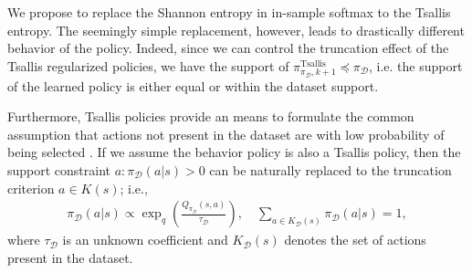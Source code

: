 \documentclass{article}
\newcommand{\AdaBracket}[1]{\left(#1\right)}
\newcommand{\AdaRectBracket}[1]{\left[#1\right]}
\newcommand{\expectation}[2]{\mathbb{E}_{#1}\AdaRectBracket{#2}}
\newcommand{\datasetPolicy}{\pi_{\mathcal{D}}}
\begin{document}
We propose to replace the Shannon entropy in in-sample softmax to the Tsallis entropy.
The seemingly simple replacement, however, leads to drastically different behavior of the policy.
Indeed, since we can control the truncation effect of the Tsallis regularized policies, we have the support of $\pi^{\text{Tsallis}}_{\datasetPolicy, k+1} \preceq \datasetPolicy$, i.e. the support of the learned policy is either equal or within the dataset support.

Furthermore, Tsallis policies provide an means to formulate the common assumption that actions not present in the dataset are with low probability of being selected \cite{Kostrikov2021-fisherCriticReg}.
If we assume the behavior policy is also a Tsallis policy, then the support constraint $a:\datasetPolicy(a|s)>0$ can be naturally replaced to the truncation criterion $a\in K(s)$; i.e.,
\begin{align}
    \datasetPolicy(a|s) \propto \exp_q\AdaBracket{\frac{Q_{\datasetPolicy}(s,a)}{\tau_\mathcal{D}}},  \quad \sum_{a\in K_\mathcal{D}(s)} \pi_\mathcal{D}(a|s)= 1,
\end{align}
where $\tau_\mathcal{D}$ is an unknown coefficient and $K_\mathcal{D}(s)$ denotes the set of actions present in the dataset.
\end{document}
